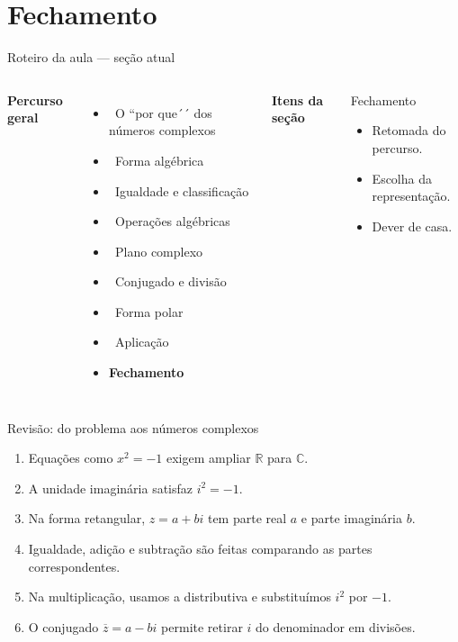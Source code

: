 \documentclass[aspectratio=169]{beamer}
\newcommand{\secaoPassada}[1]{{\color{ThemeSecondary}\checkmark\ #1}}
\newcommand{\secaoAtual}[1]{{\color{ThemeAccent}\textbf{\large #1}}}
\newcommand{\MapaSecao}[3]{%
\begin{frame}{Roteiro da aula — seção atual}
\vspace{-0.55em}
\begin{columns}[T,onlytextwidth]
\column{0.54\textwidth}
\footnotesize
\textbf{Percurso geral}\par\vspace{0.25em}
#1
\column{0.03\textwidth}
\column{0.35\textwidth}
\footnotesize
\textbf{Itens da seção}\par\vspace{0.25cm}
\begin{block}{#2}
#3
\end{block}
\column{0.03\textwidth}
\end{columns}
\end{frame}
}
\begin{document}
\section{Fechamento}

\MapaSecao{
\begin{itemize}
  \item \secaoPassada{O ``por que´´ dos números complexos}
  \item \secaoPassada{Forma algébrica}
  \item \secaoPassada{Igualdade e classificação}
  \item \secaoPassada{Operações algébricas}
  \item \secaoPassada{Plano complexo}
  \item \secaoPassada{Conjugado e divisão}
  \item \secaoPassada{Forma polar}
  \item \secaoPassada{Aplicação}
  \item \secaoAtual{Fechamento}
\end{itemize}
}{Fechamento}{
\begin{itemize}
  \item Retomada do percurso.
  \item Escolha da representação.
  \item Dever de casa.
\end{itemize}
}

\begin{frame}{Revisão: do problema aos números complexos}
\vspace{-0.45em}
\small
\begin{enumerate}
  \setlength{\itemsep}{5pt}
  \item Equações como $x^2=-1$ exigem ampliar $\mathbb{R}$ para $\mathbb{C}$.
  \item A unidade imaginária satisfaz $i^2=-1$.
  \item Na forma retangular, $z=a+bi$ tem parte real $a$ e parte imaginária $b$.
  \item Igualdade, adição e subtração são feitas comparando as partes correspondentes.
  \item Na multiplicação, usamos a distributiva e substituímos $i^2$ por $-1$.
  \item O conjugado $\overline z=a-bi$ permite retirar $i$ do denominador em divisões.
\end{enumerate}
\end{frame}
\end{document}
